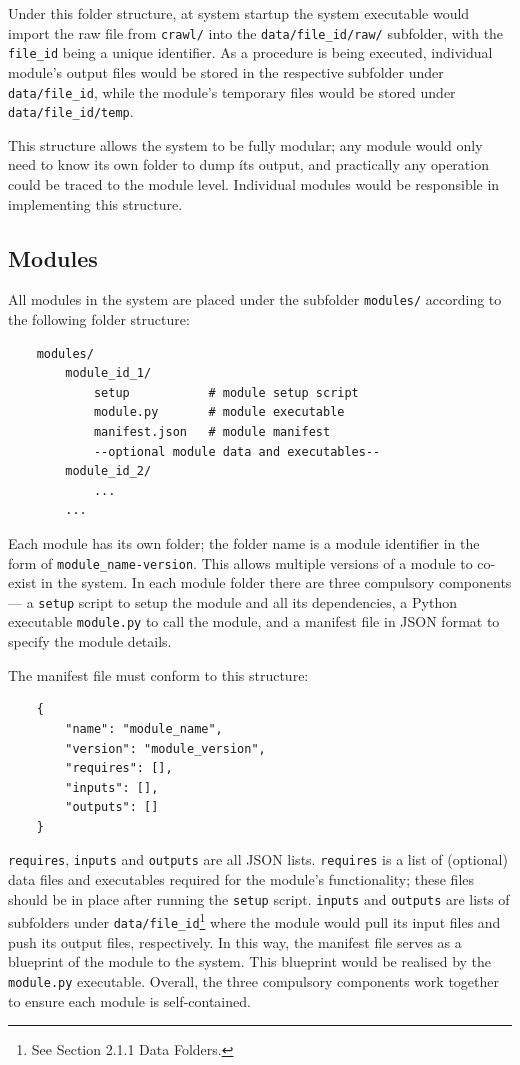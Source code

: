 Under this folder structure, at system startup the system executable would import the raw file from \texttt{crawl/} into the \texttt{data/file\_id/raw/} subfolder, with the \texttt{file\_id} being a unique identifier. As a procedure is being executed, individual module's output files would be stored in the respective subfolder under \texttt{data/file\_id}, while the module's temporary files would be stored under \texttt{data/file\_id/temp}.

This structure allows the system to be fully modular; any module would only need to know its own folder to dump íts output, and practically any operation could be traced to the module level. Individual modules would be responsible in implementing this structure.

\subsection{Modules}

All modules in the system are placed under the subfolder \texttt{modules/} according to the following folder structure:

\begin{lstlisting}
    modules/
        module_id_1/
            setup           # module setup script
            module.py       # module executable
            manifest.json   # module manifest
            --optional module data and executables--
        module_id_2/
            ...
        ...            
\end{lstlisting}

Each module has its own folder; the folder name is a module identifier in the form of \texttt{module\_name-version}. This allows multiple versions of a module to co-exist in the system. In each module folder there are three compulsory components --- a \texttt{setup} script to setup the module and all its dependencies, a Python executable \texttt{module.py} to call the module, and a manifest file in JSON format to specify the module details.

The manifest file must conform to this structure:

\begin{lstlisting}
    {
        "name": "module_name",
        "version": "module_version",
        "requires": [],
        "inputs": [],
        "outputs": []
    }
\end{lstlisting}

\texttt{requires}, \texttt{inputs} and \texttt{outputs} are all JSON lists. \texttt{requires} is a list of (optional) data files and executables required for the module's functionality; these files should be in place after running the \texttt{setup} script. \texttt{inputs} and \texttt{outputs} are lists of subfolders under \texttt{data/file\_id}\footnote{See Section 2.1.1 Data Folders.} where the module would pull its input files and push its output files, respectively. In this way, the manifest file serves as a blueprint of the module to the system. This blueprint would be realised by the \texttt{module.py} executable. Overall, the three compulsory components work together to ensure each module is self-contained.

